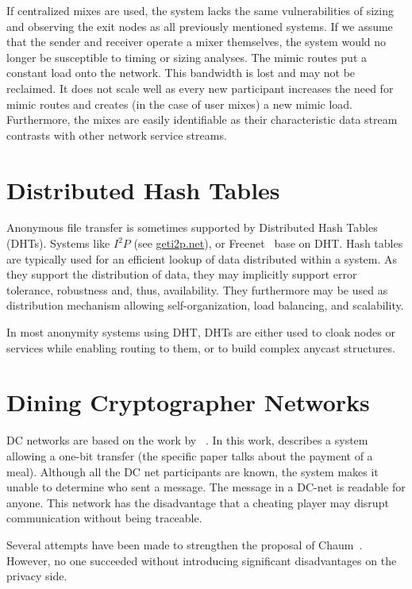 If centralized mixes are used, the system lacks the same vulnerabilities of sizing and observing the exit nodes as all previously mentioned systems. If we assume that the sender and receiver operate a mixer themselves, the system would no longer be susceptible to timing or sizing analyses. The mimic routes put a constant load onto the network. This bandwidth is lost and may not be reclaimed. It does not scale well as every new participant increases the need for mimic routes and creates (in the case of user mixes) a new mimic load. Furthermore, the mixes are easily identifiable as their characteristic data stream contrasts with other network service streams.

\section{Distributed Hash Tables}
Anonymous file transfer is sometimes supported by Distributed Hash Tables (DHTs). Systems like $I^2P$ (see \href{https://geti2p.net/}{geti2p.net}), or Freenet~\cite{freenet} base on DHT. Hash tables are typically used for an efficient lookup of data distributed within a system. As they support the distribution of data, they may implicitly support error tolerance, robustness and, thus, availability. They furthermore may be used as distribution mechanism allowing self-organization, load balancing, and scalability.

In most anonymity systems using DHT, DHTs are either used to cloak nodes or services while enabling routing to them, or to build complex anycast structures.

\section{Dining Cryptographer Networks}
DC networks are based on the work  by \citeauthor{chaum-dc}~\cite{chaum-dc}. In this work, \citeauthor{chaum-dc} describes a system allowing a one-bit transfer (the specific paper talks about the payment of a meal). Although all the DC net participants are known, the system makes it unable to determine who sent a message. The message in a DC-net is readable for anyone. This network has the disadvantage that a cheating player may disrupt communication without being traceable.

Several attempts have been made to strengthen the proposal of Chaum~\cite{golle:eurocrypt2004,disco,herbivore:tr,Corrigan-Gibbs:2010:DAA:1866307.1866346}. However, no one succeeded without introducing significant disadvantages on the privacy side.

